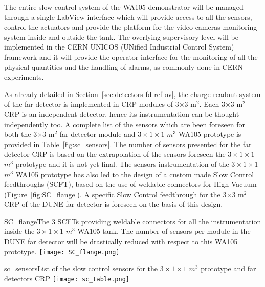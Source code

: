 The entire slow control system of the WA105 demonstrator will be managed through a single LabView  interface which will provide access to all the sensors, control the actuators and provide the platform for the video-cameras monitoring system inside and outside the tank. The overlying supervisory level  will be implemented in the CERN UNICOS (UNified Industrial Control System) framework \cite{unicos} and it will provide the operator interface for the monitoring of all the physical quantities and the handling of alarms, as commonly done in CERN experiments.

As already detailed in Section~\ref{sec:detectors-fd-ref-ov}, the charge readout system of the far detector is implemented in CRP modules of 3$\times$3 m$^2$. Each 3$\times$3 m$^2$ CRP is an independent detector, hence its instrumentation can be thought independently too. A complete list of the sensors which are been foreseen for both the 3$\times$3 m$^2$ far detector module and $3 \times 1 \times 1$ $m^3$ WA105 prototype  is provided in Table~\ref{fig:sc_sensors}. The number of sensors presented for the far detector CRP is  based on the extrapolation of the sensors foreseen the $3 \times 1 \times 1$ $m^3$ prototype and it is not yet final.  The sensors instrumentation of the $3 \times 1 \times 1$ $m^3$ WA105 prototype  has also led to the design of a custom made Slow Control feedthroughs (SCFT), based on the use of weldable connectors for High Vacuum (Figure~\ref{fig:SC_flange}). A specific Slow Control feedthrough for the 3$\times$3 m$^2$ CRP of the DUNE far detector is foreseen on the basis of this design.

\begin{cdrfigure}{SC_flange}{The 3 SCFTs providing weldable connectors for all the instrumentation inside the  $3 \times 1 \times 1$ $m^3$  WA105 tank. The number of sensors per module in the DUNE far detector will be drastically reduced with respect to this WA105 prototype.}
  \texttt{[image: SC\_flange.png]}
 \end{cdrfigure}

\begin{cdrfigure}{sc_sensors}{List of the slow control sensors for the $3 \times 1 \times 1$ $m^3$ prototype and far detectors CRP}
 \texttt{[image: sc\_table.png]} %
 \end{cdrfigure}